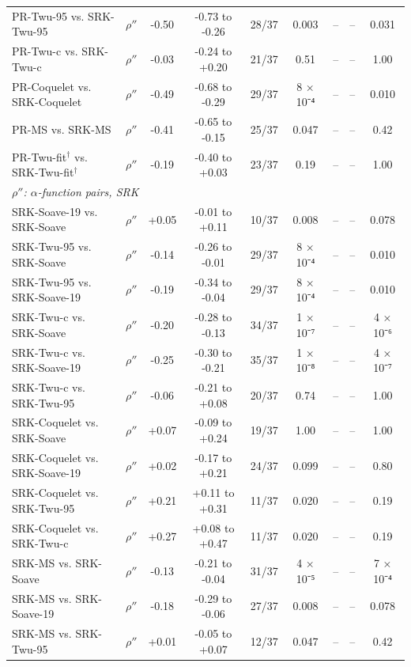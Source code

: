 \begin{table}[H]
\begin{tabular}{llccccccc}
PR-Twu-95 vs. SRK-Twu-95 & $\rho''$ & -0.50 & -0.73 to -0.26 & 28/37 & 0.003 & -- & -- & 0.031 \\
PR-Twu-c vs. SRK-Twu-c & $\rho''$ & -0.03 & -0.24 to +0.20 & 21/37 & 0.51 & -- & -- & 1.00 \\
PR-Coquelet vs. SRK-Coquelet & $\rho''$ & -0.49 & -0.68 to -0.29 & 29/37 & 8 × 10⁻⁴ & -- & -- & 0.010 \\
PR-MS vs. SRK-MS & $\rho''$ & -0.41 & -0.65 to -0.15 & 25/37 & 0.047 & -- & -- & 0.42 \\
PR-Twu-fit$^{\dagger}$ vs. SRK-Twu-fit$^{\dagger}$ & $\rho''$ & -0.19 & -0.40 to +0.03 & 23/37 & 0.19 & -- & -- & 1.00 \\
\multicolumn{9}{l}{\emph{$\rho''$: $\alpha$-function pairs, SRK}} \\
SRK-Soave-19 vs. SRK-Soave & $\rho''$ & +0.05 & -0.01 to +0.11 & 10/37 & 0.008 & -- & -- & 0.078 \\
SRK-Twu-95 vs. SRK-Soave & $\rho''$ & -0.14 & -0.26 to -0.01 & 29/37 & 8 × 10⁻⁴ & -- & -- & 0.010 \\
SRK-Twu-95 vs. SRK-Soave-19 & $\rho''$ & -0.19 & -0.34 to -0.04 & 29/37 & 8 × 10⁻⁴ & -- & -- & 0.010 \\
SRK-Twu-c vs. SRK-Soave & $\rho''$ & -0.20 & -0.28 to -0.13 & 34/37 & 1 × 10⁻⁷ & -- & -- & 4 × 10⁻⁶ \\
SRK-Twu-c vs. SRK-Soave-19 & $\rho''$ & -0.25 & -0.30 to -0.21 & 35/37 & 1 × 10⁻⁸ & -- & -- & 4 × 10⁻⁷ \\
SRK-Twu-c vs. SRK-Twu-95 & $\rho''$ & -0.06 & -0.21 to +0.08 & 20/37 & 0.74 & -- & -- & 1.00 \\
SRK-Coquelet vs. SRK-Soave & $\rho''$ & +0.07 & -0.09 to +0.24 & 19/37 & 1.00 & -- & -- & 1.00 \\
SRK-Coquelet vs. SRK-Soave-19 & $\rho''$ & +0.02 & -0.17 to +0.21 & 24/37 & 0.099 & -- & -- & 0.80 \\
SRK-Coquelet vs. SRK-Twu-95 & $\rho''$ & +0.21 & +0.11 to +0.31 & 11/37 & 0.020 & -- & -- & 0.19 \\
SRK-Coquelet vs. SRK-Twu-c & $\rho''$ & +0.27 & +0.08 to +0.47 & 11/37 & 0.020 & -- & -- & 0.19 \\
SRK-MS vs. SRK-Soave & $\rho''$ & -0.13 & -0.21 to -0.04 & 31/37 & 4 × 10⁻⁵ & -- & -- & 7 × 10⁻⁴ \\
SRK-MS vs. SRK-Soave-19 & $\rho''$ & -0.18 & -0.29 to -0.06 & 27/37 & 0.008 & -- & -- & 0.078 \\
SRK-MS vs. SRK-Twu-95 & $\rho''$ & +0.01 & -0.05 to +0.07 & 12/37 & 0.047 & -- & -- & 0.42 \\

\end{tabular}
\end{table}

